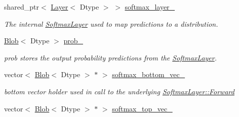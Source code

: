 \begin{DoxyCompactItemize}
\item 
shared\+\_\+ptr$<$ \hyperlink{classcaffe_1_1Layer}{Layer}$<$ Dtype $>$ $>$ \hyperlink{classcaffe_1_1SoftmaxWithLossLayer_a886b9e8c044917b03e7d2d04e713a05b}{softmax\+\_\+layer\+\_\+}\hypertarget{classcaffe_1_1SoftmaxWithLossLayer_a886b9e8c044917b03e7d2d04e713a05b}{}\label{classcaffe_1_1SoftmaxWithLossLayer_a886b9e8c044917b03e7d2d04e713a05b}

\begin{DoxyCompactList}\small\item\em The internal \hyperlink{classcaffe_1_1SoftmaxLayer}{Softmax\+Layer} used to map predictions to a distribution. \end{DoxyCompactList}\item 
\hyperlink{classcaffe_1_1Blob}{Blob}$<$ Dtype $>$ \hyperlink{classcaffe_1_1SoftmaxWithLossLayer_a02669f20097006452d877ea05e98b775}{prob\+\_\+}\hypertarget{classcaffe_1_1SoftmaxWithLossLayer_a02669f20097006452d877ea05e98b775}{}\label{classcaffe_1_1SoftmaxWithLossLayer_a02669f20097006452d877ea05e98b775}

\begin{DoxyCompactList}\small\item\em prob stores the output probability predictions from the \hyperlink{classcaffe_1_1SoftmaxLayer}{Softmax\+Layer}. \end{DoxyCompactList}\item 
vector$<$ \hyperlink{classcaffe_1_1Blob}{Blob}$<$ Dtype $>$ $\ast$ $>$ \hyperlink{classcaffe_1_1SoftmaxWithLossLayer_aa39f89b673da5e6f86c6b1f79ced1270}{softmax\+\_\+bottom\+\_\+vec\+\_\+}\hypertarget{classcaffe_1_1SoftmaxWithLossLayer_aa39f89b673da5e6f86c6b1f79ced1270}{}\label{classcaffe_1_1SoftmaxWithLossLayer_aa39f89b673da5e6f86c6b1f79ced1270}

\begin{DoxyCompactList}\small\item\em bottom vector holder used in call to the underlying \hyperlink{classcaffe_1_1Layer_aa5fc9ddb31b58958653372bdaaccde94}{Softmax\+Layer\+::\+Forward} \end{DoxyCompactList}\item 
vector$<$ \hyperlink{classcaffe_1_1Blob}{Blob}$<$ Dtype $>$ $\ast$ $>$ \hyperlink{classcaffe_1_1SoftmaxWithLossLayer_a0fd219e185b46acce8fd74cb71dabf44}{softmax\+\_\+top\+\_\+vec\+\_\+}\hypertarget{classcaffe_1_1SoftmaxWithLossLayer_a0fd219e185b46acce8fd74cb71dabf44}{}\label{classcaffe_1_1SoftmaxWithLossLayer_a0fd219e185b46acce8fd74cb71dabf44}


\end{DoxyCompactItemize}
